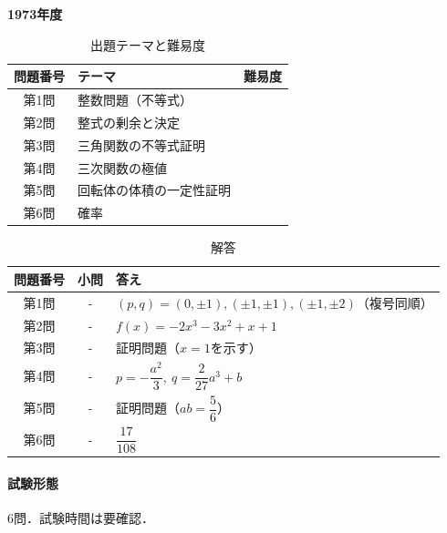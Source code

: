 \documentclass[../../main.tex]{subfiles}
\begin{document}
\begin{center}
  {\fontsize{48pt}{58pt}\selectfont \textbf{1973}\normalsize\textbf{年度}}
\end{center}

\begin{table}[htb]
  \centering
  \caption{出題テーマと難易度}
  \begin{tabular}{|c|p{9cm}|c|}
    \hline
    \textbf{問題番号} & \textbf{テーマ} & \textbf{難易度} \\
    \hline
    第1問 & 整数問題（不等式） & \\
    \hline
    第2問 & 整式の剰余と決定 & \\
    \hline
    第3問 & 三角関数の不等式証明 & \\
    \hline
    第4問 & 三次関数の極値 & \\
    \hline
    第5問 & 回転体の体積の一定性証明 & \\
    \hline
    第6問 & 確率 & \\
    \hline
  \end{tabular}
\end{table}

\begin{table}[htb]
  \centering
  \caption{解答}
  \renewcommand{\arraystretch}{1.4}
  \begin{tabular}{|c|c|p{9cm}|}
    \hline
    \textbf{問題番号} & \textbf{小問} & \textbf{答え} \\
    \hline
    第1問 & - & $(p,q)=(0,\pm1),(\pm1,\pm1),(\pm1,\pm2)$（複号同順） \\
    \hline
    第2問 & - & $f(x)=-2x^3-3x^2+x+1$ \\
    \hline
    第3問 & - & 証明問題（$x=1$を示す） \\
    \hline
    第4問 & - & $p=-\dfrac{a^2}{3},\ q=\dfrac{2}{27}a^3+b$ \\
    \hline
    第5問 & - & 証明問題（$ab=\dfrac{5}{6}$） \\
    \hline
    第6問 & - & $\dfrac{17}{108}$ \\
    \hline
  \end{tabular}
\end{table}

\paragraph{試験形態}
6問．試験時間は要確認．
\end{document}
